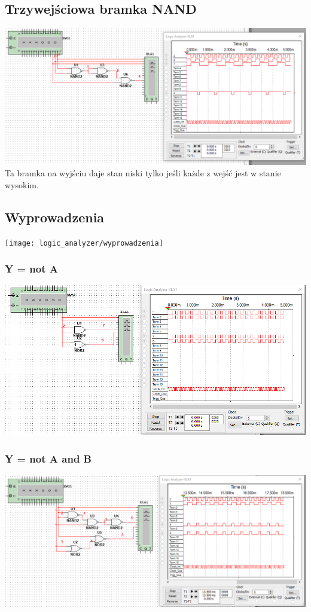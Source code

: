 \documentclass[12pt,a4paper]{article}
\begin{document}
\subsection{Trzywejściowa bramka NAND}
\includegraphics[width=\textwidth]{logic_analyzer/three_way_nand}
Ta bramka na wyjściu daje stan niski tylko jeśli każde z wejść jest w stanie wysokim.

\subsection{Wyprowadzenia}
\texttt{[image: logic\_analyzer/wyprowadzenia]}
\newpage
\subsubsection{Y = not A}
\includegraphics[width=\textwidth]{logic_analyzer/not_a}

\subsubsection{Y = not A and B}
\includegraphics[width=\textwidth]{logic_analyzer/not_a_and_b}
\end{document}

